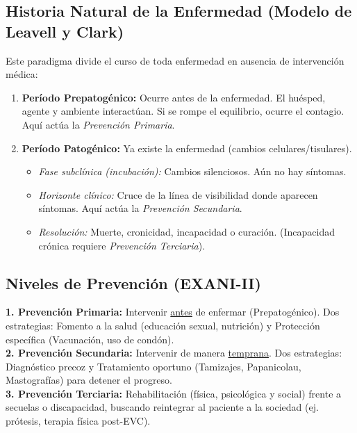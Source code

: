 \documentclass[spanish,letterpaper,oneside]{article}
\begin{document}
\subsection{Historia Natural de la Enfermedad (Modelo de Leavell y Clark)}
Este paradigma divide el curso de toda enfermedad en ausencia de intervención médica:
\begin{enumerate}
    \item \textbf{Período Prepatogénico:} Ocurre antes de la enfermedad. El huésped, agente y ambiente interactúan. Si se rompe el equilibrio, ocurre el contagio. Aquí actúa la \textit{Prevención Primaria}.
    \item \textbf{Período Patogénico:} Ya existe la enfermedad (cambios celulares/tisulares).
    \begin{itemize}
        \item \textit{Fase subclínica (incubación):} Cambios silenciosos. Aún no hay síntomas.
        \item \textit{Horizonte clínico:} Cruce de la línea de visibilidad donde aparecen síntomas. Aquí actúa la \textit{Prevención Secundaria}.
        \item \textit{Resolución:} Muerte, cronicidad, incapacidad o curación. (Incapacidad crónica requiere \textit{Prevención Terciaria}).
    \end{itemize}
\end{enumerate}

\subsection{Niveles de Prevención (EXANI-II)}
\begin{tcolorbox}[colback=orange!5!white,colframe=orange!80!black,title=Los 3 Niveles Prevencionistas Clásicos]
\textbf{1. Prevención Primaria:} Intervenir \underline{antes} de enfermar (Prepatogénico). Dos estrategias: Fomento a la salud (educación sexual, nutrición) y Protección específica (Vacunación, uso de condón).\\
\textbf{2. Prevención Secundaria:} Intervenir de manera \underline{temprana}. Dos estrategias: Diagnóstico precoz y Tratamiento oportuno (Tamizajes, Papanicolau, Mastografías) para detener el progreso.\\
\textbf{3. Prevención Terciaria:} Rehabilitación (física, psicológica y social) frente a secuelas o discapacidad, buscando reintegrar al paciente a la sociedad (ej. prótesis, terapia física post-EVC).
\end{tcolorbox}
\end{document}
